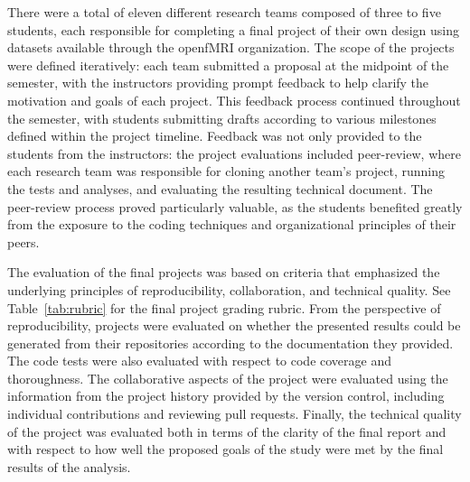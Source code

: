 There were a total of eleven different research teams composed of three
to five students, each responsible for completing a final project of their
own design using datasets available through the openfMRI organization.
The scope of the projects were defined iteratively: each team submitted a 
proposal at the midpoint of the semester, with the instructors providing
prompt feedback to help clarify the motivation and goals of each project.
This feedback process continued throughout the semester, with students 
submitting drafts according to various milestones defined within the project
timeline.
Feedback was not only provided to the students from the instructors: the
project evaluations included peer-review, where each research team was
responsible for cloning another team's project, running the tests and analyses,
and evaluating the resulting technical document.
The peer-review process proved particularly valuable, as the students 
benefited greatly from the exposure to the coding techniques and 
organizational principles of their peers.

The evaluation of the final projects was based on criteria that emphasized the
underlying principles of reproducibility, collaboration, and technical
quality.
See Table~\ref{tab:rubric} for the final project grading rubric.
From the perspective of reproducibility, projects were evaluated on whether the
presented results could be generated from their repositories according to the
documentation they provided.
The code tests were also evaluated with respect to code coverage
and thoroughness.
The collaborative aspects of the project were evaluated using the information
from the project history provided by the version control, including
individual contributions and reviewing pull requests.
Finally, the technical quality of the project was evaluated both in terms of
the clarity of the final report and with respect to how well the proposed
goals of the study were met by the final results of the analysis.

